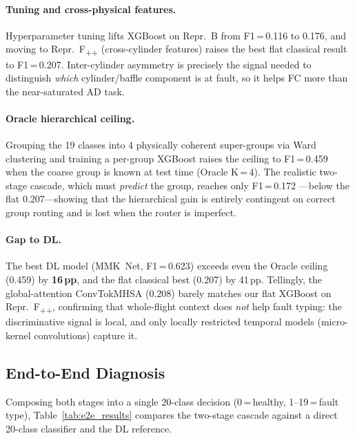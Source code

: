 \paragraph{Tuning and cross-physical features.}
Hyperparameter tuning lifts XGBoost on Repr.~B from F1\,=\,0.116 to 0.176, and
moving to Repr.~F\textsubscript{++} (cross-cylinder features) raises the best
flat classical result to F1\,=\,0.207. Inter-cylinder asymmetry is precisely the
signal needed to distinguish \emph{which} cylinder/baffle component is at fault,
so it helps FC more than the near-saturated AD task.

\paragraph{Oracle hierarchical ceiling.}
Grouping the 19 classes into 4 physically coherent super-groups via Ward
clustering and training a per-group XGBoost raises the ceiling to F1\,=\,0.459
when the coarse group is known at test time (Oracle K\,=\,4). The realistic
two-stage cascade, which must \emph{predict} the group, reaches only F1\,=\,0.172
---below the flat 0.207---showing that the hierarchical gain is entirely
contingent on correct group routing and is lost when the router is imperfect.

\paragraph{Gap to DL.}
The best DL model (MMK~Net, F1\,=\,0.623) exceeds even the Oracle ceiling
(0.459) by \textbf{16\,pp}, and the flat classical best (0.207) by 41\,pp.
Tellingly, the global-attention ConvTokMHSA (0.208) barely matches our flat
XGBoost on Repr.~F\textsubscript{++}, confirming that whole-flight context does
\emph{not} help fault typing: the discriminative signal is local, and only
locally restricted temporal models (micro-kernel convolutions) capture it.

\subsection{End-to-End Diagnosis}
\label{subsec:results_e2e}

Composing both stages into a single 20-class decision
(0\,=\,healthy, 1--19\,=\,fault type), Table~\ref{tab:e2e_results} compares the
two-stage cascade against a direct 20-class classifier and the DL reference.

